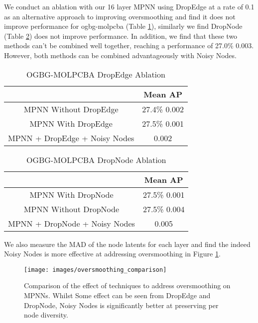 \documentclass{article} \usepackage{iclr2022_conference,times}
\begin{document}
We conduct an ablation with our 16 layer MPNN  using DropEdge at a rate of 0.1 as an alternative approach to improving oversmoothing and find it does not improve performance for ogbg-molpcba (Table \ref{tab:ogbg-molpcba-dropedge}), similarly we find DropNode (Table \ref{tab:ogbg-molpcba-dropnode}) does not improve performance. In addition, we find that these two methods can't be combined well together, reaching a performance of 27.0\%  0.003. However, both methods can be combined advantageously with Noisy Nodes.

\begin{table}[]
    \centering
    \begin{tabular}{c|c}
        \toprule
         & Mean AP \\
        \midrule
        MPNN Without DropEdge & 27.4\%  0.002 \\
        MPNN With DropEdge &  27.5\%  0.001 \\
        MPNN + DropEdge + Noisy Nodes &    0.002 \\
        \bottomrule
    \end{tabular}
    \caption{OGBG-MOLPCBA DropEdge Ablation}
    \label{tab:ogbg-molpcba-dropedge}
\end{table}

\begin{table}[]
    \centering
    \begin{tabular}{c|c}
        \toprule
         & Mean AP \\
        \midrule
        MPNN With DropNode &  27.5\%  0.001 \\
        MPNN Without DropNode & 27.5\%  0.004 \\
        MPNN + DropNode + Noisy Nodes &    0.005 \\
        \bottomrule
    \end{tabular}
    \caption{OGBG-MOLPCBA DropNode Ablation}
    \label{tab:ogbg-molpcba-dropnode}
\end{table}

We also measure the MAD of the node latents for each layer and find the indeed Noisy Nodes is more effective at addressing oversmoothing in Figure \ref{fig:oversmoothing-comparison}.

\begin{figure}
    \centering
    \texttt{[image: images/oversmoothing\_comparison]}
    \caption{Comparison of the effect of techniques to address oversmoothing on MPNNs. Whilst Some effect can be seen from DropEdge and DropNode, Noisy Nodes is significantly better at preserving per node diversity.}
    \label{fig:oversmoothing-comparison}
\end{figure}
\end{document}
